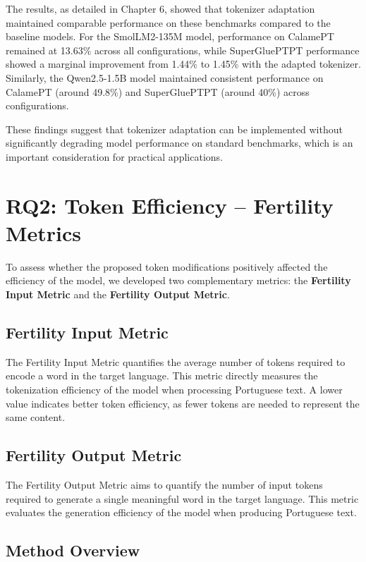 The results, as detailed in Chapter 6, showed that tokenizer adaptation maintained comparable performance on these benchmarks compared to the baseline models. For the SmolLM2-135M model, performance on CalamePT remained at 13.63\% across all configurations, while SuperGluePTPT performance showed a marginal improvement from 1.44\% to 1.45\% with the adapted tokenizer. Similarly, the Qwen2.5-1.5B model maintained consistent performance on CalamePT (around 49.8\%) and SuperGluePTPT (around 40\%) across configurations.

These findings suggest that tokenizer adaptation can be implemented without significantly degrading model performance on standard benchmarks, which is an important consideration for practical applications.

\section{RQ2: Token Efficiency – Fertility Metrics}
\label{sec:fertility_metric}

To assess whether the proposed token modifications positively affected the efficiency of the model, we developed two complementary metrics: the \textbf{Fertility Input Metric} and the \textbf{Fertility Output Metric}.

\subsection{Fertility Input Metric}
The Fertility Input Metric quantifies the average number of tokens required to encode a word in the target language. This metric directly measures the tokenization efficiency of the model when processing Portuguese text. A lower value indicates better token efficiency, as fewer tokens are needed to represent the same content.

\subsection{Fertility Output Metric}
The Fertility Output Metric aims to quantify the number of input tokens required to generate a single meaningful word in the target language. This metric evaluates the generation efficiency of the model when producing Portuguese text.

\subsection{Method Overview}

